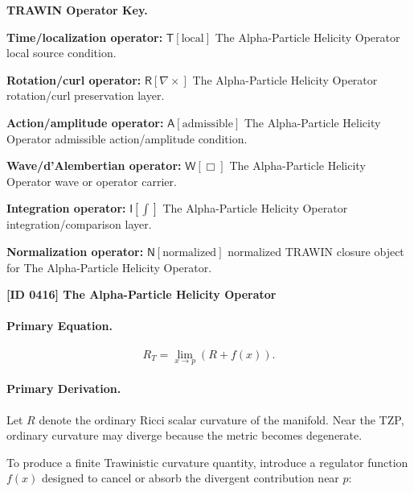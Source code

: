 \par\vspace{0.45\baselineskip}
\noindent\begin{minipage}[t]{\linewidth}
\begingroup
\small
\raggedright
\textbf{TRAWIN Operator Key.}\par
\noindent\textbf{Time/localization operator:} $\mathsf{T}\!\left[\mathrm{local}\right]$ The Alpha-Particle Helicity Operator local source condition.\par
\noindent\textbf{Rotation/curl operator:} $\mathsf{R}\!\left[\nabla\times\right]$ The Alpha-Particle Helicity Operator rotation/curl preservation layer.\par
\noindent\textbf{Action/amplitude operator:} $\mathsf{A}\!\left[\mathrm{admissible}\right]$ The Alpha-Particle Helicity Operator admissible action/amplitude condition.\par
\noindent\textbf{Wave/d'Alembertian operator:} $\mathsf{W}\!\left[\Box\right]$ The Alpha-Particle Helicity Operator wave or operator carrier.\par
\noindent\textbf{Integration operator:} $\mathsf{I}\!\left[\int\right]$ The Alpha-Particle Helicity Operator integration/comparison layer.\par
\noindent\textbf{Normalization operator:} $\mathsf{N}\!\left[\mathrm{normalized}\right]$ normalized TRAWIN closure object for The Alpha-Particle Helicity Operator.\par
\endgroup
\end{minipage}

\clearpage
\noindent\textbf{[ID 0416] The Alpha-Particle Helicity Operator}\par
\vspace{0.35em}
\paragraph{Primary Equation.}
\begin{equation}
R_T
=
\lim_{x\to p}
\left(
R+f(x)
\right).
\end{equation}

\paragraph{Primary Derivation.}
Let $R$ denote the ordinary Ricci scalar curvature of the manifold.  
Near the TZP, ordinary curvature may diverge because the metric becomes degenerate.

To produce a finite Trawinistic curvature quantity, introduce a regulator function $f(x)$ designed to cancel or absorb the divergent contribution near $p$:

